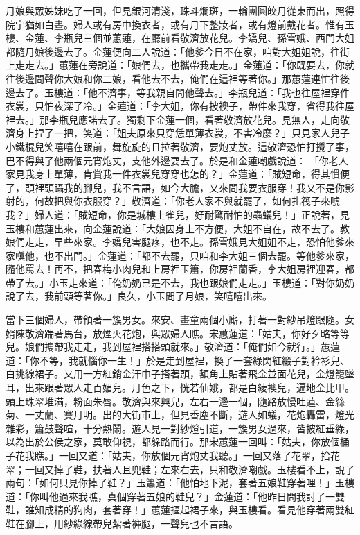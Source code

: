 月娘與眾姊妹吃了一回，但見銀河清淺，珠斗爛斑，一輪團圓皎月從東而出，照得院宇猶如白晝。婦人或有房中換衣者，或有月下整妝者，或有燈前戴花者。惟有玉樓、金蓮、李瓶兒三個並蕙蓮，在廳前看敬濟放花兒。李嬌兒、孫雪娥、西門大姐都隨月娘後邊去了。金蓮便向二人說道：「他爹今日不在家，咱對大姐姐說，往街上走走去。」蕙蓮在旁說道：「娘們去，也攜帶我走走。」金蓮道：「你既要去，你就往後邊問聲你大娘和你二娘，看他去不去，俺們在這裡等著你。」那蕙蓮連忙往後邊去了。玉樓道：「他不濟事，等我親自問他聲去。」李瓶兒道：「我也往屋裡穿件衣裳，只怕夜深了冷。」金蓮道：「李大姐，你有披襖子，帶件來我穿，省得我往屋裡去。」那李瓶兒應諾去了。獨剩下金蓮一個，看著敬濟放花兒。見無人，走向敬濟身上捏了一把，笑道：「姐夫原來只穿恁單薄衣裳，不害冷麼？」只見家人兒子小鐵棍兒笑嘻嘻在跟前，舞旋旋的且拉著敬濟，要炮丈放。這敬濟恐怕打攪了事，巴不得與了他兩個元宵炮丈，支他外邊耍去了。於是和金蓮嘲戲說道： 「你老人家見我身上單薄，肯賞我一件衣裳兒穿穿也怎的？」金蓮道：「賊短命，得其慣便了，頭裡頭躡我的腳兒，我不言語，如今大膽，又來問我要衣服穿！我又不是你影射的，何故把與你衣服穿？」敬濟道：「你老人家不與就罷了，如何扎筏子來唬我？」婦人道：「賊短命，你是城樓上雀兒，好耐驚耐怕的蟲蟻兒！」正說著，見玉樓和蕙蓮出來，向金蓮說道：「大娘因身上不方便，大姐不自在，故不去了。教娘們走走，早些來家。李嬌兒害腿疼，也不走。孫雪娥見大姐姐不走，恐怕他爹來家嗔他，也不出門。」金蓮道：「都不去罷，只咱和李大姐三個去罷。等他爹來家，隨他罵去！再不，把春梅小肉兒和上房裡玉簫，你房裡蘭香，李大姐房裡迎春，都帶了去。」小玉走來道：「俺奶奶已是不去，我也跟娘們走走。」玉樓道：「對你奶奶說了去，我前頭等著你。」良久，小玉問了月娘，笑嘻嘻出來。

當下三個婦人，帶領著一簇男女。來安、畫童兩個小廝，打著一對紗吊燈跟隨。女婿陳敬濟踹著馬台，放煙火花炮，與眾婦人瞧。宋蕙蓮道：「姑夫，你好歹略等等兒。娘們攜帶我走走，我到屋裡搭搭頭就來。」敬濟道：「俺們如今就行。」蕙蓮道：「你不等，我就惱你一生！」於是走到屋裡，換了一套綠閃紅緞子對衿衫兒、白挑線裙子。又用一方紅銷金汗巾子搭著頭，額角上貼著飛金並面花兒，金燈籠墜耳，出來跟著眾人走百媚兒。月色之下，恍若仙娥，都是白綾襖兒，遍地金比甲。頭上珠翠堆滿，粉面朱唇。敬濟與來興兒，左右一邊一個，隨路放慢吐蓮、金絲菊、一丈蘭、賽月明。出的大街市上，但見香塵不斷，遊人如蟻，花炮轟雷，燈光雜彩，簫鼓聲喧，十分熱鬧。遊人見一對紗燈引道，一簇男女過來，皆披紅垂綠，以為出於公侯之家，莫敢仰視，都躲路而行。那宋蕙蓮一回叫：「姑夫，你放個桶子花我瞧。」一回又道：「姑夫，你放個元宵炮丈我聽。」一回又落了花翠，拾花翠；一回又掉了鞋，扶著人且兜鞋；左來右去，只和敬濟嘲戲。玉樓看不上，說了兩句：「如何只見你掉了鞋？」玉簫道：「他怕地下泥，套著五娘鞋穿著哩！」玉樓道：「你叫他過來我瞧，真個穿著五娘的鞋兒？」金蓮道：「他昨日問我討了一雙鞋，誰知成精的狗肉，套著穿！」蕙蓮摳起裙子來，與玉樓看。看見他穿著兩雙紅鞋在腳上，用紗綠線帶兒紮著褲腿，一聲兒也不言語。

